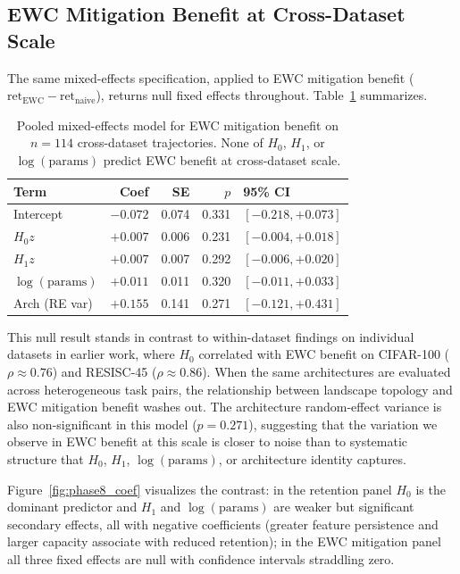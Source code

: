 \documentclass[10pt,twocolumn]{article}
\begin{document}
\subsection{EWC Mitigation Benefit at Cross-Dataset Scale}
\label{sec:ewc_benefit}

The same mixed-effects specification, applied to EWC mitigation benefit ($\text{ret}_{\text{EWC}} - \text{ret}_{\text{naive}}$), returns null fixed effects throughout. Table~\ref{tab:phase8_q4} summarizes.

\begin{table}[t]
\centering
\caption{Pooled mixed-effects model for EWC mitigation benefit on $n = 114$ cross-dataset trajectories. None of $H_0$, $H_1$, or $\log(\text{params})$ predict EWC benefit at cross-dataset scale.}
\label{tab:phase8_q4}
\small
\setlength{\tabcolsep}{4pt}
\begin{tabular}{@{}lrrrl@{}}
\toprule
Term & Coef & SE & $p$ & 95\% CI \\
\midrule
Intercept     & $-0.072$ & 0.074 & 0.331 & $[-0.218, +0.073]$ \\
$H_0 z$       & $+0.007$ & 0.006 & 0.231 & $[-0.004, +0.018]$ \\
$H_1 z$       & $+0.007$ & 0.007 & 0.292 & $[-0.006, +0.020]$ \\
$\log(\text{params})$ & $+0.011$ & 0.011 & 0.320 & $[-0.011, +0.033]$ \\
Arch (RE var) & $+0.155$ & 0.141 & 0.271 & $[-0.121, +0.431]$ \\
\bottomrule
\end{tabular}
\end{table}

This null result stands in contrast to within-dataset findings on individual datasets in earlier work, where $H_0$ correlated with EWC benefit on CIFAR-100 ($\rho \approx 0.76$) and RESISC-45 ($\rho \approx 0.86$). When the same architectures are evaluated across heterogeneous task pairs, the relationship between landscape topology and EWC mitigation benefit washes out. The architecture random-effect variance is also non-significant in this model ($p = 0.271$), suggesting that the variation we observe in EWC benefit at this scale is closer to noise than to systematic structure that $H_0$, $H_1$, $\log(\text{params})$, or architecture identity captures.

Figure~\ref{fig:phase8_coef} visualizes the contrast: in the retention panel $H_0$ is the dominant predictor and $H_1$ and $\log(\text{params})$ are weaker but significant secondary effects, all with negative coefficients (greater feature persistence and larger capacity associate with reduced retention); in the EWC mitigation panel all three fixed effects are null with confidence intervals straddling zero.
\end{document}
